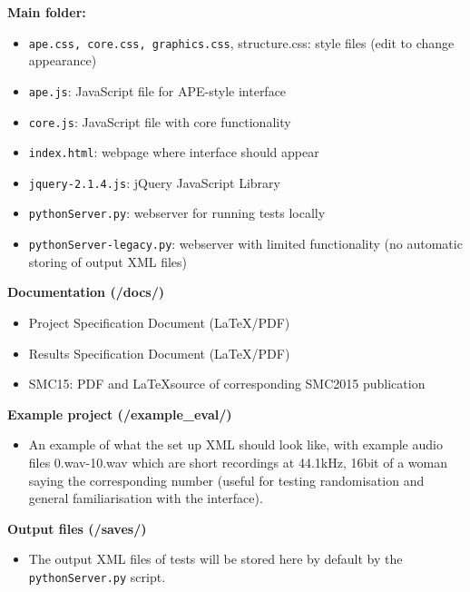 \documentclass[11pt, oneside]{article}   	%
\begin{document}
		\textbf{Main folder:} 
		\begin{itemize}
                    	\item \texttt{ape.css, core.css, graphics.css}, structure.css: style files (edit to change appearance)
                    	\item \texttt{ape.js}: JavaScript file for APE-style interface \cite{deman2014b}
                    	\item \texttt{core.js}: JavaScript file with core functionality
                    	\item \texttt{index.html}: webpage where interface should appear
                    	\item \texttt{jquery-2.1.4.js}: jQuery JavaScript Library
                    	\item \texttt{pythonServer.py}: webserver for running tests locally
                    	\item \texttt{pythonServer-legacy.py}: webserver with limited functionality (no automatic storing of output XML files)\\
		\end{itemize}
                 \textbf{Documentation (/docs/)}
                 \begin{itemize}
                    	\item Project Specification Document (\LaTeX/PDF)
                    	\item Results Specification Document (\LaTeX/PDF)
                    	\item SMC15: PDF and \LaTeX source of corresponding SMC2015 publication \cite{deman2015c}\\
		\end{itemize}
                 \textbf{Example project (/example\_eval/)}
                    	\begin{itemize}
                    	\item An example of what the set up XML should look like, with example audio files 0.wav-10.wav which are short recordings at 44.1kHz, 16bit of a woman saying the corresponding number (useful for testing randomisation and general familiarisation with the interface).\\ \end{itemize}
                  \textbf{Output files (/saves/)}
                    	\begin{itemize}
                    	\item The output XML files of tests will be stored here by default by the \texttt{pythonServer.py} script.\\ \end{itemize}
\end{document}
